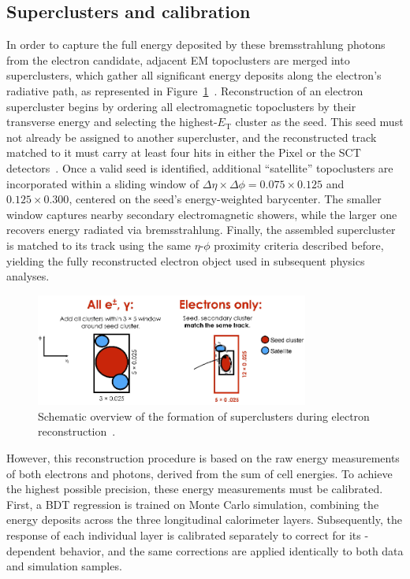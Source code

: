 \subsection{Superclusters and calibration}

In order to capture the full energy deposited by these bremsstrahlung photons from the electron candidate, adjacent EM topoclusters are merged into superclusters, which gather all significant energy deposits along the electron’s radiative path, as represented in Figure~\ref{fig:superclust}~\cite{Aad:2684552}.
\FloatBarrier
Reconstruction of an electron supercluster begins by ordering all electromagnetic topoclusters by their transverse energy and selecting the highest-$E_{\text{T}}$ cluster as the seed. This seed must not already be assigned to another supercluster, and the reconstructed track matched to it must carry at least four hits in either the Pixel or the SCT detectors~\cite{Aad:2684552}. Once a valid seed is identified, additional “satellite” topoclusters are incorporated within a sliding window of \(\Delta\eta\times\Delta\phi = 0.075\times0.125\) and \(0.125\times0.300\), centered on the seed’s energy-weighted barycenter. The smaller window captures nearby secondary electromagnetic showers, while the larger one recovers energy radiated via bremsstrahlung. Finally, the assembled supercluster is matched to its track using the same \(\eta\)-\(\phi\) proximity criteria described before, yielding the fully reconstructed electron object used in subsequent physics analyses.  

\begin{figure}[htbp]
  \centering
  \includegraphics[width=0.8\textwidth]{images/superclusters.png}
  \caption{Schematic overview of the formation of superclusters during electron reconstruction~\cite{Aad:2684552}.}
  \label{fig:superclust}
\end{figure}

However, this reconstruction procedure is based on the raw energy measurements of both electrons and photons, derived from the sum of cell energies. To achieve the highest possible precision, these energy measurements must be calibrated. First, a BDT regression is trained on Monte Carlo simulation, combining the energy deposits across the three longitudinal calorimeter layers. Subsequently, the response of each individual layer is calibrated separately to correct for its \et-dependent behavior, and the same corrections are applied identically to both data and simulation samples.

